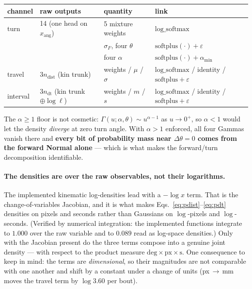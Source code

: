 \documentclass[11pt,a4paper]{article}
\newcommand{\dth}{\ensuremath{\Delta\theta}}
\begin{document}
\begin{center}\small
\begin{tabular}{llll}
\toprule
\textbf{channel} & \textbf{raw outputs} & \textbf{quantity} & \textbf{link} \\
\midrule
turn        & 14 (one head on $x_{\mathrm{ang}}$)
            & 5 mixture weights & $\mathrm{log\_softmax}$ \\
            & & $\sigma_F$, four $\theta$ & $\mathrm{softplus}(\cdot)+\varepsilon$ \\
            & & four $\alpha$ & $\mathrm{softplus}(\cdot)+\alpha_{\min}$ \\
\addlinespace
travel      & $3n_{\mathrm{dist}}$ (kin trunk)
            & weights / $\mu$ / $\sigma$ &
              $\mathrm{log\_softmax}$ / identity / $\mathrm{softplus}+\varepsilon$ \\
\addlinespace
interval    & $3n_{\mathrm{dt}}$ (kin trunk $\oplus \log\ell$)
            & weights / $m$ / $s$ &
              $\mathrm{log\_softmax}$ / identity / $\mathrm{softplus}+\varepsilon$ \\
\bottomrule
\end{tabular}
\end{center}

The $\alpha \geq 1$ floor is not cosmetic: $\Gamma(u;\alpha,\theta) \sim u^{\alpha-1}$ as
$u \to 0^{+}$, so $\alpha < 1$ would let the density \emph{diverge} at zero turn angle.
With $\alpha > 1$ enforced, all four Gammas vanish there and \textbf{every bit of
probability mass near $\dth = 0$ comes from the forward Normal alone} --- which is what
makes the forward/turn decomposition identifiable.

\paragraph{The densities are over the raw observables, not their logarithms.} The
implemented kinematic log-densities lead with a $-\log x$ term. That is the
change-of-variables Jacobian, and it is what makes
Eqs.~\eqref{eq:pdist}--\eqref{eq:pdt} densities on pixels and seconds rather than Gaussians
on $\log$-pixels and $\log$-seconds. (Verified by numerical integration: the implemented
functions integrate to $1.000$ over the raw variable and to $0.089$ read as log-space
densities.) Only with the Jacobian present do the three terms compose into a genuine joint
density --- with respect to the product measure $\mathrm{deg} \times \mathrm{px} \times
\mathrm{s}$. One consequence to keep in mind: the terms are \emph{dimensional}, so their
magnitudes are not comparable with one another and shift by a constant under a change of
units (px\,$\to$\,mm moves the travel term by $\log 3.60$ per bout).
\end{document}
